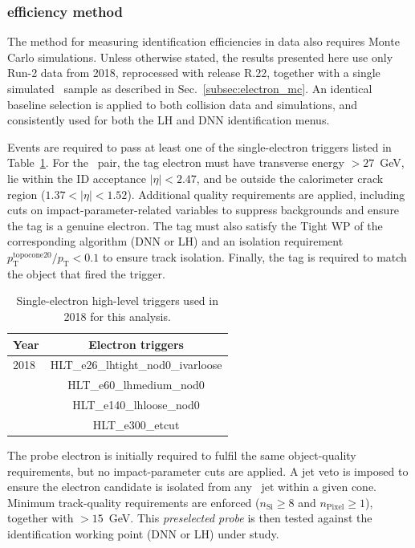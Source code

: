 \subsubsection{\zmass efficiency method}

The \zmass method for measuring identification efficiencies in data also requires Monte Carlo simulations. Unless otherwise stated, the results presented here use only Run-2 data from 2018, reprocessed with release R.22, together with a single simulated \zee\ sample as described in Sec.~\ref{subsec:electron_mc}. An identical baseline selection is applied to both collision data and simulations, and consistently used for both the LH and DNN identification menus.

Events are required to pass at least one of the single-electron triggers listed in Table~\ref{tab:electron_triggers_2018}. For the \tp\ pair, the tag electron must have transverse energy \et$>27$~GeV, lie within the ID acceptance $|\eta|<2.47$, and be outside the calorimeter crack region ($1.37<|\eta|<1.52$). Additional quality requirements are applied, including cuts on impact-parameter-related variables to suppress backgrounds and ensure the tag is a genuine electron. The tag must also satisfy the Tight WP of the corresponding algorithm (DNN or LH) and an isolation requirement $p_{\mathrm{T}}^{\mathrm{topocone20}}/p_{\mathrm{T}}<0.1$ to ensure track isolation. Finally, the tag is required to match the object that fired the trigger.

\begin{table}[htbp]
  \small 
  \centering
  \begin{tabular}{lc}
  \hline
  \textbf{Year} & \textbf{Electron triggers} \\
  \hline
  2018 & HLT\_e26\_lhtight\_nod0\_ivarloose \\
       & HLT\_e60\_lhmedium\_nod0 \\
       & HLT\_e140\_lhloose\_nod0 \\
       & HLT\_e300\_etcut \\
  \hline
  \end{tabular}
  \caption{Single-electron high-level triggers used in 2018 for this analysis.}
  \label{tab:electron_triggers_2018}
\end{table}

The probe electron is initially required to fulfil the same object-quality requirements, but no impact-parameter cuts are applied. A jet veto is imposed to ensure the electron candidate is isolated from any \antikt\ jet within a given cone. Minimum track-quality requirements are enforced ($n_{\mathrm{Si}} \ge 8$ and $n_{\mathrm{Pixel}} \ge 1$), together with \et$>15$~GeV. This \textit{preselected probe} is then tested against the identification working point (DNN or LH) under study.

